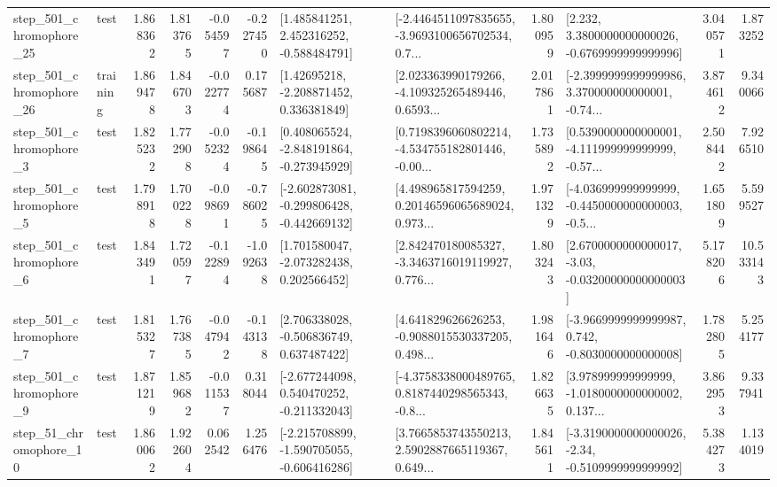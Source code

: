\begin{tabular}{llrrrrllrlrr}
  step\_501\_chromophore\_25 &      test &      1.868362 &    1.813765 &     -0.054597 & -0.227450 &    [1.485841251, 2.452316252, -0.588484791] &  [-2.4464511097835655, -3.9693100656702534, 0.7... &       1.800959 &   [2.232, 3.3800000000000026, -0.6769999999999996] &            3.040571 &          1.873252 \\
  step\_501\_chromophore\_26 &  training &      1.869478 &    1.846703 &     -0.022774 &  0.175687 &     [1.42695218, -2.208871452, 0.336381849] &  [2.023363990179266, -4.109325265489446, 0.6593... &       2.017861 &  [-2.3999999999999986, 3.370000000000001, -0.74... &            3.874612 &          9.340066 \\
   step\_501\_chromophore\_3 &      test &      1.825232 &    1.772908 &     -0.052324 & -0.198645 &   [0.408065524, -2.848191864, -0.273945929] &  [0.7198396060802214, -4.534755182801446, -0.00... &       1.735892 &  [0.5390000000000001, -4.111999999999999, -0.57... &            2.508442 &          7.926510 \\
   step\_501\_chromophore\_5 &      test &      1.798918 &    1.700228 &     -0.098691 & -0.786025 &  [-2.602873081, -0.299806428, -0.442669132] &  [4.498965817594259, 0.20146596065689024, 0.973... &       1.971329 &  [-4.036999999999999, -0.4450000000000003, -0.5... &            1.651809 &          5.599527 \\
   step\_501\_chromophore\_6 &      test &      1.843491 &    1.720597 &     -0.122894 & -1.092638 &    [1.701580047, -2.073282438, 0.202566452] &  [2.842470180085327, -3.3463716019119927, 0.776... &       1.803243 &  [2.6700000000000017, -3.03, -0.03200000000000003] &            5.178206 &         10.533143 \\
   step\_501\_chromophore\_7 &      test &      1.815327 &    1.767385 &     -0.047942 & -0.143138 &    [2.706338028, -0.506836749, 0.637487422] &  [4.641829626626253, -0.9088015530337205, 0.498... &       1.981646 &  [-3.9669999999999987, 0.742, -0.8030000000000008] &            1.782805 &          5.254177 \\
   step\_501\_chromophore\_9 &      test &      1.871219 &    1.859682 &     -0.011537 &  0.318044 &   [-2.677244098, 0.540470252, -0.211332043] &  [-4.3758338000489765, 0.8187440298565343, -0.8... &       1.826635 &  [3.978999999999999, -1.0180000000000002, 0.137... &            3.862953 &          9.337941 \\
   step\_51\_chromophore\_10 &      test &      1.860062 &    1.922604 &      0.062542 &  1.256476 &  [-2.215708899, -1.590705055, -0.606416286] &  [3.7665853743550213, 2.5902887665119367, 0.649... &       1.845611 &  [-3.3190000000000026, -2.34, -0.5109999999999992] &            5.384273 &          1.134019 \\

\end{tabular}

